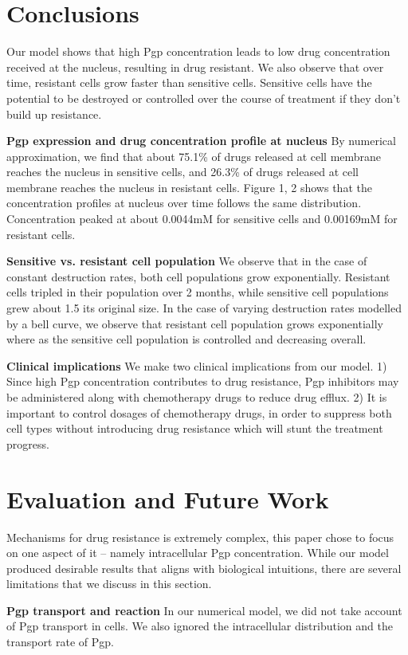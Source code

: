 \documentclass{edm_article}
\begin{document}
\section{Conclusions}
Our model shows that high Pgp concentration leads to low drug concentration received at the nucleus, resulting in drug resistant. We also observe that over time, resistant cells grow faster than sensitive cells. Sensitive cells have the potential to be destroyed or controlled over the course of treatment if they don't build up resistance.

\textbf{Pgp expression and drug concentration profile at nucleus} By numerical approximation, we find that about 75.1\% of drugs released at cell membrane reaches the nucleus in sensitive cells, and 26.3\% of drugs released at cell membrane reaches the nucleus in resistant cells. Figure 1, 2 shows that the concentration profiles at nucleus over time follows the same distribution. Concentration peaked at about 0.0044mM for sensitive cells and 0.00169mM for resistant cells. 

\textbf{Sensitive vs. resistant cell population} We observe that in the case of constant destruction rates, both cell populations grow exponentially. Resistant cells tripled in their population over 2 months, while sensitive cell populations grew about 1.5 its original size. In the case of varying destruction rates modelled by a bell curve, we observe that resistant cell population grows exponentially where as the sensitive cell population is controlled and decreasing overall. 

\textbf{Clinical implications} We make two clinical implications from our model. 1) Since high Pgp concentration contributes to drug resistance, Pgp inhibitors may be administered along with chemotherapy drugs to reduce drug efflux. 2) It is important to control dosages of chemotherapy drugs, in order to suppress both cell types without introducing drug resistance which will stunt the treatment progress. 

\section{Evaluation and Future Work}
Mechanisms for drug resistance is extremely complex, this paper chose to focus on one aspect of it -- namely intracellular Pgp concentration. While our model produced desirable results that aligns with biological intuitions, there are several limitations that we discuss in this section.

\textbf{Pgp transport and reaction} In our numerical model, we did not take account of Pgp transport in cells. We also ignored the intracellular distribution and the transport rate of Pgp. 
\end{document}
